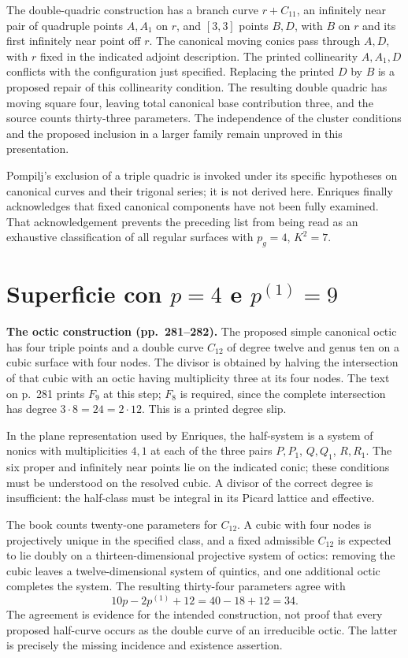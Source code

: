 The double-quadric construction has a branch curve \(r+C_{11}\), an infinitely near pair of quadruple points \(A,A_1\) on \(r\), and \([3,3]\) points \(B,D\), with \(B\) on \(r\) and its first infinitely near point off \(r\). The canonical moving conics pass through \(A,D\), with \(r\) fixed in the indicated adjoint description. The printed collinearity \(A,A_1,D\) conflicts with the configuration just specified. Replacing the printed \(D\) by \(B\) is a proposed repair of this collinearity condition. The resulting double quadric has moving square four, leaving total canonical base contribution three, and the source counts thirty-three parameters. The independence of the cluster conditions and the proposed inclusion in a larger family remain unproved in this presentation.

Pompilj's exclusion of a triple quadric is invoked under its specific hypotheses on canonical curves and their trigonal series; it is not derived here. Enriques finally acknowledges that fixed canonical components have not been fully examined. That acknowledgement prevents the preceding list from being read as an exhaustive classification of all regular surfaces with \(p_g=4\), \(K^2=7\).

\section{Superficie con \texorpdfstring{$p=4$}{p=4} e \texorpdfstring{$p^{(1)}=9$}{p(1)=9}}
\label{cp2-viii-5}

\textbf{The octic construction (pp.~281--282).}
The proposed simple canonical octic has four triple points and a double curve \(C_{12}\) of degree twelve and genus ten on a cubic surface with four nodes. The divisor is obtained by halving the intersection of that cubic with an octic having multiplicity three at its four nodes. The text on p.~281 prints \(F_9\) at this step; \(F_8\) is required, since the complete intersection has degree \(3\cdot8=24=2\cdot12\). This is a printed degree slip.

In the plane representation used by Enriques, the half-system is a system of nonics with multiplicities \(4,1\) at each of the three pairs \(P,P_1\), \(Q,Q_1\), \(R,R_1\). The six proper and infinitely near points lie on the indicated conic; these conditions must be understood on the resolved cubic. A divisor of the correct degree is insufficient: the half-class must be integral in its Picard lattice and effective.

The book counts twenty-one parameters for \(C_{12}\). A cubic with four nodes is projectively unique in the specified class, and a fixed admissible \(C_{12}\) is expected to lie doubly on a thirteen-dimensional projective system of octics: removing the cubic leaves a twelve-dimensional system of quintics, and one additional octic completes the system. The resulting thirty-four parameters agree with
\[
10p-2p^{(1)}+12=40-18+12=34.
\]
The agreement is evidence for the intended construction, not proof that every proposed half-curve occurs as the double curve of an irreducible octic. The latter is precisely the missing incidence and existence assertion.

